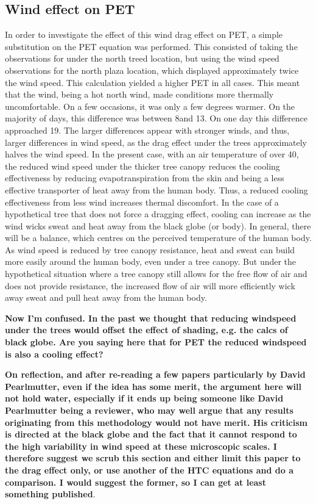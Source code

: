 \documentclass[twocolumn, a4paper]{article}
\providecommand{\comment}[1]{{\large\bf #1}}
\begin{document}
\subsection{Wind effect on PET}
In order to investigate the effect of this wind drag effect on PET, a simple substitution on the PET equation was performed. This consisted of taking the observations for under the north treed location, but using the wind speed observations for the north plaza location, which displayed approximately twice the wind speed. This calculation yielded a higher PET in all cases. This meant that the wind, being a hot north wind, made conditions more thermally uncomfortable. On a few occasions, it was only a few degrees warmer. On the majority of days, this difference was between 8\celsius and 13\celsius. On one day this difference approached 19\celsius. The larger differences appear with stronger winds, and thus, larger differences in wind speed, as the drag effect under the trees approximately halves the wind speed.
In the present case, with an air temperature of over 40\celsius, the reduced wind speed under the thicker tree canopy reduces the cooling effectiveness by reducing evapotranspiration from the skin and being a less effective transporter of heat away from the human body. Thus, a reduced cooling effectiveness from less wind increases thermal discomfort. In the case of a hypothetical tree that does not force a dragging effect, cooling can increase as the wind wicks sweat and heat away from the black globe (or body).
In general, there will be a balance, which centres on the perceived temperature of the human body. As wind speed is reduced by tree canopy resistance, heat and sweat can build more easily around the human body, even under a tree canopy. But under the hypothetical situation where a tree canopy still allows for the free flow of air and does not provide resistance, the increased flow of air will more efficiently wick away sweat and pull heat away from the human body.

\comment{Now I'm confused. In the past we thought that reducing windspeed under the trees would offset the effect of shading, e.g. the calcs of black globe. Are you saying here that for PET the reduced windspeed is also a cooling effect?}


\comment{On reflection, and after re-reading a few papers particularly by David Pearlmutter, even if the idea has some merit, the argument here will not hold water, especially if it ends up being someone like David Pearlmutter being a reviewer, who may well argue that any results originating from this methodology would not have merit. His criticism is directed at the black globe and the fact that it cannot respond to the high variability in wind speed at these microscopic scales. I therefore suggest we scrub this section and either limit this paper to the drag effect only, or use another of the HTC equations and do a comparison. I would suggest the former, so I can get at least something published}.
\end{document}
